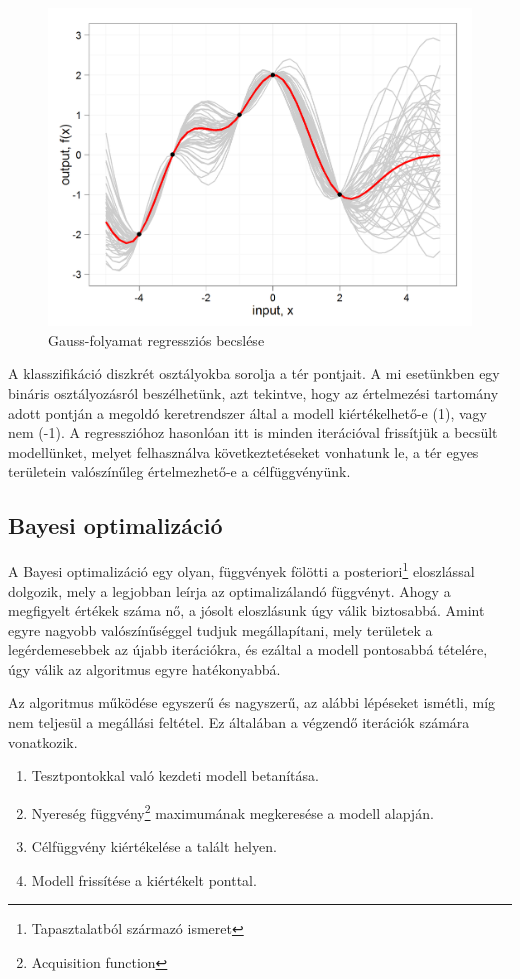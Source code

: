 \begin{figure}[!ht]
	\centering
	\includegraphics[width=140mm, keepaspectratio]{figures/gp.png}
	\caption{Gauss-folyamat regressziós becslése}
	\label{fig:gp}
\end{figure}

A klasszifikáció diszkrét osztályokba sorolja a tér pontjait. A mi esetünkben egy bináris osztályozásról beszélhetünk, azt tekintve, hogy az értelmezési tartomány adott pontján a megoldó keretrendszer által a modell kiértékelhető-e (1), vagy nem (-1). A regresszióhoz hasonlóan itt is minden iterációval frissítjük a becsült modellünket, melyet felhasználva következtetéseket vonhatunk le, a tér egyes területein valószínűleg értelmezhető-e a célfüggvényünk.\cite{GPKonyv}

\subsection{Bayesi optimalizáció}

\label{subsec:bayes}
A Bayesi optimalizáció egy olyan, függvények fölötti a posteriori\footnote{Tapasztalatból származó ismeret} eloszlással dolgozik, mely a legjobban leírja az optimalizálandó függvényt. Ahogy a megfigyelt értékek száma nő, a jósolt eloszlásunk úgy válik biztosabbá. Amint egyre nagyobb valószínűséggel tudjuk megállapítani, mely területek a legérdemesebbek az újabb iterációkra, és ezáltal a modell pontosabbá tételére, úgy válik az algoritmus egyre hatékonyabbá.

Az algoritmus működése egyszerű és nagyszerű, az alábbi lépéseket ismétli, míg nem teljesül a megállási feltétel. Ez általában a végzendő iterációk számára vonatkozik.
\begin{enumerate}
	\item Tesztpontokkal való kezdeti modell betanítása.
	\item Nyereség függvény\footnote{Acquisition function} maximumának megkeresése a modell alapján.
	\item Célfüggvény kiértékelése a talált helyen.
	\item Modell frissítése a kiértékelt ponttal.
\end{enumerate}

